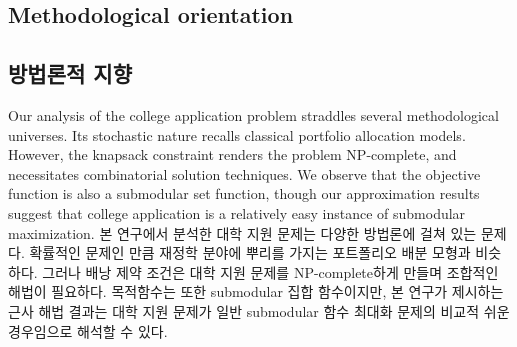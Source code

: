 \documentclass[11pt]{article} %
\theoremstyle{definition}
\theoremstyle{definition}
\begin{document}
\ifen \subsection{Methodological orientation} \else \subsection{방법론적 지향} \fi
\ifen
Our analysis of the college application problem straddles several methodological universes. Its stochastic nature recalls classical portfolio allocation models. However, the knapsack constraint renders the problem NP-complete, and necessitates combinatorial solution techniques. We observe that the objective function is also a submodular set function, though our approximation results suggest that college application is a relatively easy instance of submodular maximization. 
\else
본 연구에서 분석한 대학 지원 문제는 다양한 방법론에 걸쳐 있는 문제다. 확률적인 문제인 만큼 재정학 분야에 뿌리를 가지는 포트폴리오 배분 모형과 비슷하다. 그러나 배낭 제약 조건은 대학 지원 문제를 NP-complete하게 만들며 조합적인 해법이 필요하다. 목적함수는 또한 submodular 집합 함수이지만, 본 연구가 제시하는 근사 해법 결과는 대학 지원 문제가 일반 submodular 함수 최대화 문제의 비교적 쉬운 경우임으로 해석할 수 있다.
\fi
\end{document}
